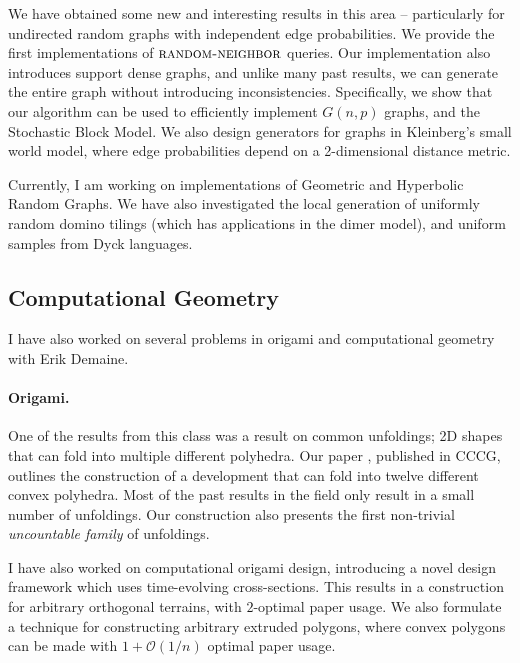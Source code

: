 We have obtained some new and interesting results in this area --
particularly for undirected random graphs with independent edge probabilities.
We provide the first implementations of $\textsc{random-neighbor}$ queries.
Our implementation also introduces support dense graphs, and unlike many past results,
we can generate the entire graph without introducing inconsistencies.
Specifically, we show that our algorithm can be used to efficiently implement $G(n,p)$ graphs, and the Stochastic Block Model.
We also design generators for graphs in Kleinberg's small world model,
where edge probabilities depend on a 2-dimensional distance metric.

Currently, I am working on implementations of Geometric and Hyperbolic Random Graphs.
We have also investigated the local generation of uniformly random domino tilings
(which has applications in the dimer model), and uniform samples from Dyck languages.

\subsection*{Computational Geometry}

I have also worked on several problems in origami and computational geometry with Erik Demaine.

\paragraph{Origami.}
One of the results from this class was a result on common unfoldings; 2D shapes that can fold into multiple different polyhedra.
Our paper \cite{common}, published in CCCG, outlines the construction of a development that can fold into twelve different convex polyhedra.
Most of the past results in the field \cite{box2, box2.5, box3, cube_tet, jz} only result in a small number of unfoldings.
Our construction also presents the first non-trivial \emph{uncountable family} of unfoldings.

I have also worked on computational origami design, introducing a novel design framework which uses time-evolving cross-sections.
This results in a construction for arbitrary orthogonal terrains, with $2$-optimal paper usage.
We also formulate a technique for constructing arbitrary extruded polygons,
where convex polygons can be made with $ 1+\mathcal{O}(1/n) $ optimal paper usage.

